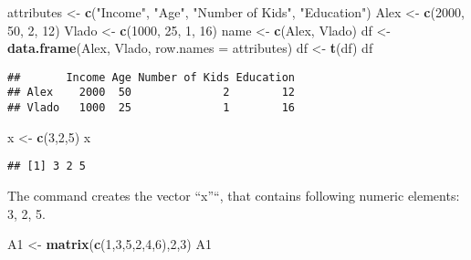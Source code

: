 \documentclass[12pt,]{article}
\newenvironment{Shaded}{\begin{snugshade}}{\end{snugshade}}
\newcommand{\KeywordTok}[1]{\textcolor[rgb]{0.13,0.29,0.53}{\textbf{#1}}}
\newcommand{\DataTypeTok}[1]{\textcolor[rgb]{0.13,0.29,0.53}{#1}}
\newcommand{\DecValTok}[1]{\textcolor[rgb]{0.00,0.00,0.81}{#1}}
\newcommand{\StringTok}[1]{\textcolor[rgb]{0.31,0.60,0.02}{#1}}
\newcommand{\NormalTok}[1]{#1}
\begin{document}
\begin{Shaded}
\begin{Highlighting}[]
\NormalTok{attributes <-}\StringTok{ }\KeywordTok{c}\NormalTok{(}\StringTok{"Income"}\NormalTok{, }\StringTok{"Age"}\NormalTok{, }\StringTok{"Number of Kids"}\NormalTok{, }\StringTok{"Education"}\NormalTok{)}
\NormalTok{Alex <-}\StringTok{ }\KeywordTok{c}\NormalTok{(}\DecValTok{2000}\NormalTok{, }\DecValTok{50}\NormalTok{, }\DecValTok{2}\NormalTok{, }\DecValTok{12}\NormalTok{)}
\NormalTok{Vlado <-}\StringTok{ }\KeywordTok{c}\NormalTok{(}\DecValTok{1000}\NormalTok{, }\DecValTok{25}\NormalTok{, }\DecValTok{1}\NormalTok{, }\DecValTok{16}\NormalTok{)}
\NormalTok{name <-}\StringTok{ }\KeywordTok{c}\NormalTok{(Alex, Vlado)}
\NormalTok{df <-}\StringTok{ }\KeywordTok{data.frame}\NormalTok{(Alex, Vlado, }\DataTypeTok{row.names =}\NormalTok{ attributes)}
\NormalTok{df <-}\StringTok{ }\KeywordTok{t}\NormalTok{(df)}
\NormalTok{df}
\end{Highlighting}
\end{Shaded}

\begin{verbatim}
##       Income Age Number of Kids Education
## Alex    2000  50              2        12
## Vlado   1000  25              1        16
\end{verbatim}

\begin{Shaded}
\begin{Highlighting}[]
\NormalTok{x <-}\StringTok{ }\KeywordTok{c}\NormalTok{(}\DecValTok{3}\NormalTok{,}\DecValTok{2}\NormalTok{,}\DecValTok{5}\NormalTok{)}
\NormalTok{x}
\end{Highlighting}
\end{Shaded}

\begin{verbatim}
## [1] 3 2 5
\end{verbatim}

The command creates the vector ``x''``, that contains following numeric
elements: 3, 2, 5.

\begin{Shaded}
\begin{Highlighting}[]
\NormalTok{A1 <-}\StringTok{ }\KeywordTok{matrix}\NormalTok{(}\KeywordTok{c}\NormalTok{(}\DecValTok{1}\NormalTok{,}\DecValTok{3}\NormalTok{,}\DecValTok{5}\NormalTok{,}\DecValTok{2}\NormalTok{,}\DecValTok{4}\NormalTok{,}\DecValTok{6}\NormalTok{),}\DecValTok{2}\NormalTok{,}\DecValTok{3}\NormalTok{)}
\NormalTok{A1}
\end{Highlighting}
\end{Shaded}
\end{document}
